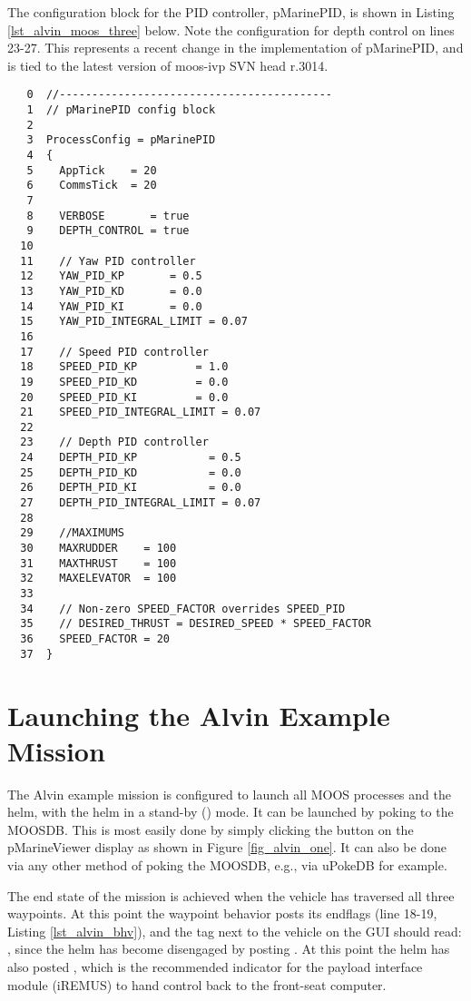 The configuration block for the PID controller, pMarinePID, is
shown in Listing \ref{lst_alvin_moos_three} below. Note the 
configuration for depth control on lines 23-27. This represents
a recent change in the implementation of pMarinePID, and is tied
to the latest version of moos-ivp SVN head r.3014.

\vspace{0.1in}
\vspace{0.1in}
\label{lst_alvin_moos_three}
\scriptsize
\begin{verbatim}
   0  //------------------------------------------
   1  // pMarinePID config block
   2  
   3  ProcessConfig = pMarinePID
   4  {
   5    AppTick    = 20
   6    CommsTick  = 20
   7  
   8    VERBOSE       = true
   9    DEPTH_CONTROL = true
  10  
  11    // Yaw PID controller
  12    YAW_PID_KP		 = 0.5
  13    YAW_PID_KD		 = 0.0
  14    YAW_PID_KI		 = 0.0
  15    YAW_PID_INTEGRAL_LIMIT = 0.07
  16  
  17    // Speed PID controller
  18    SPEED_PID_KP		 = 1.0
  19    SPEED_PID_KD		 = 0.0
  20    SPEED_PID_KI		 = 0.0
  21    SPEED_PID_INTEGRAL_LIMIT = 0.07
  22  
  23    // Depth PID controller
  24    DEPTH_PID_KP           = 0.5
  25    DEPTH_PID_KD           = 0.0
  26    DEPTH_PID_KI           = 0.0
  27    DEPTH_PID_INTEGRAL_LIMIT = 0.07
  28  
  29    //MAXIMUMS
  30    MAXRUDDER    = 100
  31    MAXTHRUST    = 100
  32    MAXELEVATOR  = 100
  33  
  34    // Non-zero SPEED_FACTOR overrides SPEED_PID
  35    // DESIRED_THRUST = DESIRED_SPEED * SPEED_FACTOR
  36    SPEED_FACTOR = 20
  37  }
\end{verbatim}
\normalsize


\section{Launching the Alvin Example Mission}

The Alvin example mission is configured to launch all MOOS processes
and the helm, with the helm in a stand-by () mode. 
It can be launched by poking  to the MOOSDB. This 
is most easily done by simply clicking the  button
on the pMarineViewer display as shown in Figure \ref{fig_alvin_one}.
It can also be done via any other method of poking the MOOSDB, e.g., 
via uPokeDB for example. 

\pskip

The end state of the mission is achieved when the vehicle has
traversed all three waypoints. At this point the waypoint behavior
posts its endflags (line 18-19, Listing \ref{lst_alvin_bhv}), and the
tag next to the vehicle on the GUI should read: , since the helm has become disengaged by posting
. At this point the helm has also
posted , which is the recommended
indicator for the payload interface module (iREMUS) to hand control
back to the front-seat computer.
